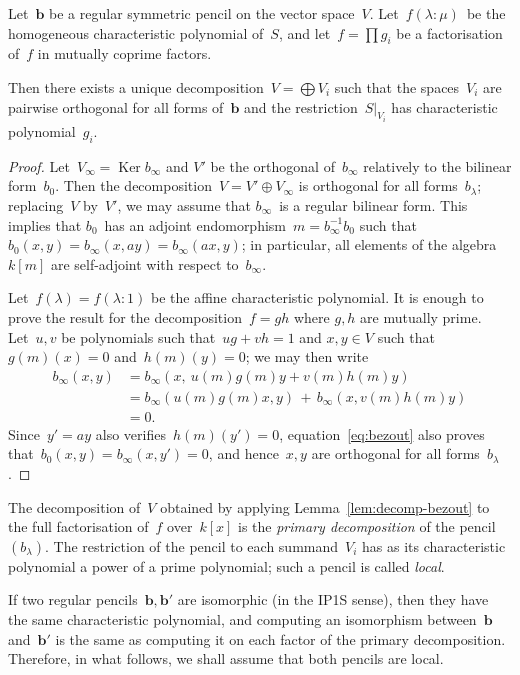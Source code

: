 \documentclass{lms}%
\DeclareMathOperator\Ker{Ker}
\begin{document}
\begin{lem}\label{lem:decomp-bezout}%
Let~$\bm{b}$ be a regular symmetric pencil on the vector space~$V$. Let~$f(λ:
μ)$~be the homogeneous characteristic polynomial of~$S$, and let~$f = ∏
g_i$ be a factorisation of~$f$ in mutually coprime factors.

Then there exists a unique decomposition~$V = ⨁ V_i$ such that the
spaces~$V_i$ are pairwise orthogonal for all forms of~$\bm{b}$ and the
restriction~$S|_{V_i}$ has characteristic polynomial~$g_i$.
\end{lem}

\begin{proof}
Let~$V_{∞} = \Ker b_{∞}$ and $V'$ be the orthogonal of~$b_{∞}$ relatively
to the bilinear form~$b_{0}$. Then the decomposition~$V = V' ⊕ V_{∞}$ is
orthogonal for all forms~$b_{λ}$; replacing~$V$ by~$V'$, we may assume
that $b_{∞}$~is a regular bilinear form. This implies that $b_0$~has an
adjoint endomorphism~$m = b_{∞}^{-1} b_0$ such that~$b_0(x,y) = b_{∞}(x,
ay) = b_{∞}(ax, y)$; in particular, all elements of the algebra~$k[m]$
are self-adjoint with respect to~$b_{∞}$.

Let~$f(λ) = f(λ: 1)$ be the affine characteristic polynomial. It is
enough to prove the result for the decomposition~$f = gh$ where $g, h$
are mutually prime. Let~$u, v$ be polynomials such that~$ug + vh = 1$ and
$x, y ∈ V$ such that~$g(m)(x) = 0$ and~$h(m)(y) = 0$; we may then write
\begin{equation}\label{eq:bezout}
\begin{split}
b_{∞} (x, y) & = b_{∞} (x,\: u(m) g(m) y + v(m) h(m) y ) \\
&= b_{∞} (u(m) g(m) x, y) \,+\, b_{∞} (x, v(m) h(m) y) \\
&= 0.
\end{split}
\end{equation}
Since~$y' = ay$ also verifies~$h(m)(y') = 0$, equation~\eqref{eq:bezout}
also proves that~$b_{0}(x,y) = b_{∞}(x,y') = 0$, and hence~$x, y$ are
orthogonal for all forms~$b_{λ}$.
\end{proof}%

The decomposition of~$V$ obtained by applying
Lemma~\ref{lem:decomp-bezout} to the full factorisation of~$f$
over~$k[x]$ is the \emph{primary decomposition} of the pencil~$(b_{λ})$.
The restriction of the pencil to each summand~$V_i$ has as its
characteristic polynomial a power of a prime polynomial; such a pencil is
called \emph{local}.

If two regular pencils~$\bm{b}, \bm{b}'$ are isomorphic (in the IP1S sense), then
they have the same characteristic polynomial, and computing an
isomorphism between~$\bm{b}$ and~$\bm{b}'$ is the same as computing it on each
factor of the primary decomposition. Therefore, in what follows, we shall
assume that both pencils are local.
\end{document}

